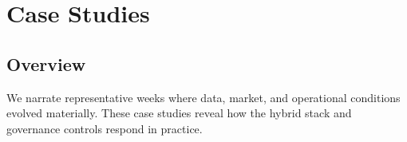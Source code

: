 \chapter{Case Studies}\label{app:case-studies}


\section{Overview}\label{app:cases-overview}
We narrate representative weeks where data, market, and operational conditions evolved materially. These case studies reveal how the hybrid stack and governance controls respond in practice.

